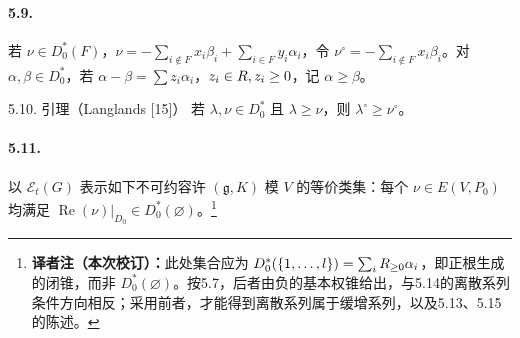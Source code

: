 \paragraph*{5.9.} 若 $\nu\in D_0^*(F)$，$\nu=-\sum_{i\notin F}x_i\beta_i+\sum_{i\in F}y_i\alpha_i$，令 $\nu^\circ=-\sum_{i\notin F}x_i\beta_i$。对 $\alpha,\beta\in D_0^*$，若 $\alpha-\beta=\sum z_i\alpha_i$，$z_i\in R,z_i\ge0$，记 $\alpha\ge\beta$。
\begin{originaltheorem}{5.10. 引理（Langlands [15]）}
若 $\lambda,\nu\in D_0^*$ 且 $\lambda\ge\nu$，则 $\lambda^\circ\ge\nu^\circ$。
\end{originaltheorem}
\paragraph*{5.11.} 以 $\mathcal E_t(G)$ 表示如下不可约容许 $(\mathfrak g,K)$ 模 $V$ 的等价类集：每个 $\nu\in E(V,P_0)$ 均满足 $\operatorname{Re}(\nu)|_{D_0}\in D_0^*(\varnothing)$。\footnote{\textbf{译者注（本次校订）：}此处集合应为 $D_0^*(\{1,\ldots,l\})=\sum_iR_{\ge0}\alpha_i$，即正根生成的闭锥，而非 $D_0^*(\varnothing)$。按5.7，后者由负的基本权锥给出，与5.14的离散系列条件方向相反；采用前者，才能得到离散系列属于缓增系列，以及5.13、5.15的陈述。}

